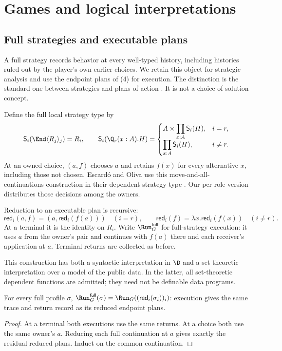 \section{Games and logical interpretations}
\label{sec:interpretations}

\subsection{Full strategies and executable plans}
\label{sec:policies}

A full strategy records behavior at every well-typed history, including
histories ruled out by the player's own earlier choices. We retain this
object for strategic analysis and use the endpoint plans of (4) for
execution. The distinction is the standard one between strategies and
plans of action \cite{Rubinstein1991}. It is not a choice of solution concept.

Define the full local strategy type by
\[
 \mathsf S_i(\End\langle R_j\rangle_j)=R_i,\qquad
 \mathsf S_i(\Q_r(x:A).H)=
 \begin{cases}
 A\times\displaystyle\prod_{x:A}\mathsf S_i(H),&i=r,\\[3pt]
 \displaystyle\prod_{x:A}\mathsf S_i(H),&i\ne r.
 \end{cases}
\]
At an owned choice, $(a,f)$ chooses $a$ and retains $f(x)$ for every
alternative $x$, including those not chosen. Escard\'o and Oliva use this
move-and-all-continuations construction in their dependent strategy type
\cite[Definition~4.1]{EscardoOliva2023}. Our per-role version distributes
those decisions among the owners.

Reduction to an executable plan is recursive:
\[
 \mathsf{red}_i(a,f)
   =(a,\mathsf{red}_i(f(a)))\quad(i=r),\qquad
 \mathsf{red}_i(f)=\lambda x.\mathsf{red}_i(f(x))\quad(i\ne r).
\]
At a terminal it is the identity on $R_i$.
Write $\Run_G^{\mathsf{full}}$ for full-strategy execution: it uses $a$
from the owner's pair and continues with
$f(a)$ there and each receiver's application at $a$. Terminal returns are
collected as before.

This construction has both a syntactic interpretation in $\D$ and a
set-theoretic interpretation over a model of the public data. In the latter,
all set-theoretic dependent functions are admitted; they need not be
definable data programs.

\begin{lemma}
\label{thm:adequacy}
For every full profile $\sigma$,
$\Run_G^{\mathsf{full}}(\sigma)
 =\Run_G((\mathsf{red}_i(\sigma_i))_i)$:
execution gives the same trace and return record as its reduced endpoint
plans.
\end{lemma}
\begin{proof}
At a terminal both executions use the same returns. At a choice both use
the same owner's $a$. Reducing each full continuation at $a$ gives exactly
the residual reduced plans. Induct on the common continuation.
\end{proof}

